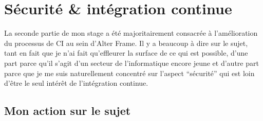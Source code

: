 \section{Sécurité \& intégration continue}
La seconde partie de mon stage a été majoritairement consacrée à l'amélioration du processus de CI au sein d'Alter Frame. Il y a beaucoup à dire sur le sujet, tant en fait que je n'ai fait qu'effleurer la surface de ce qui est possible, d'une part parce qu'il s'agit d'un secteur de l'informatique encore jeune et d'autre part parce que je me suis naturellement concentré sur l'aspect ``sécurité'' qui est loin d'être le seul intérêt de l'intégration continue.



\subsection{Mon action sur le sujet}